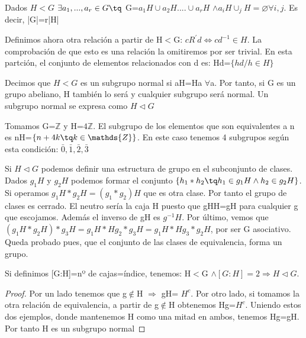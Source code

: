 \documentclass[a4paper,10pt]{apuntes}
\newenvironment{example}[1][Ejemplo]{\begin{trivlist}
\item[\hskip \labelsep {\bfseries #1}]}{\end{trivlist}}
\begin{document}
  \begin{theorem}
   Dados $H<G$  $\exists a_{1},...,a_{r}\in G\tq$  G=$a_{1}H \cup a_{2}H.... \cup a_{r}H$  $\wedge a_{i}H\cup_{j}H=\varnothing \forall i,j$.
   Es decir, |G|=r|H|
  \end{theorem}

  Definimos ahora otra relación a partir de H$<$G: $cR^{'}d \Leftrightarrow cd^{-1}\in H$. La comprobación de que esto es una relación
  la omitiremos por ser trivial. En esta partción, el conjunto de elementos relacionados con d es: Hd=$\{hd/h\in H\}$
  \begin{defn}
   Decimos que $H<G$  es un subgrupo normal si aH=Ha $\forall$a. Por tanto, si G es un grupo abeliano, H también lo será y cualquier
   subgrupo será normal. Un subgrupo normal se expresa como $H\lhd G$
  \end{defn}
  \begin{example}
   Tomamos G=$\mathds{Z}$  y H=$4\mathds{Z}$. 
   El subgrupo de los elementos que son equivalentes a n es nH=$\{n+4k\tq k \in \mathds{Z}\}$.
   En este caso tenemos 4 subgrupos según esta condición: $\bar{0},\bar{1},\bar{2},\bar{3}$
  \end{example}
  
  Si $H\lhd G$  podemos definir una estructura de grupo en el subconjunto de clases.
  Dados $g_{1}H$  y $g_{2}H$  podemos formar el conjunto $\{h_{1}*h_{2}\tq h_{1}\in g_{1}H \wedge h_{2}\in g_{2}H\}$. Si operamos
  $g_{1}H*g_{2}H=(g_{1}*g_{2})H$  que es otra clase. Por tanto el grupo de clases es cerrado.
  El neutro sería la caja H puesto que gHH=gH para cualquier g que escojamos. Además el inverso de gH es $g^{-1}H$.
  Por último, vemos que $(g_{1}H*g_{2}H)*g_{3}H=g_{1}H*Hg_{2}*g_{3}H=g_{1}H*Hg_{3}*g_{2}H$, por ser G asociativo. Queda probado pues, 
  que el conjunto de las clases de equivalencia, forma un grupo.
  
  \begin{theorem}
   Si definimos [G:H]=nº de cajas=índice, tenemos:
   H$<$G $\wedge[G:H]=2 \Rightarrow H \lhd G$.
  \end{theorem}
  \begin{proof}
   Por un lado tenemos que g$\notin$H $\Rightarrow$  gH= $H^{c}$.
   Por otro lado, si tomamos la otra relación de equivalencia, a partir de g$\notin$H obtenemos Hg=$H^{c}$.
   Uniendo estos dos ejemplos, donde mantenemos H como una mitad en ambos, tenemos Hg=gH. Por tanto H es un subgrupo normal
  \end{proof}
\end{document}
